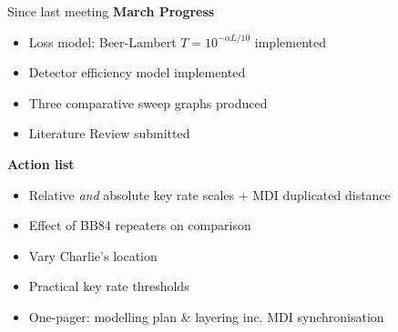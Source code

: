 \documentclass[10pt]{beamer}
\begin{document}
\begin{frame}{Since last meeting}
    \textbf{March Progress}
    \begin{itemize}\small
        \item Loss model: Beer-Lambert $T = 10^{-\alpha L/10}$ implemented
        \item Detector efficiency model implemented
        \item Three comparative sweep graphs produced
        \item Literature Review submitted
    \end{itemize}
    \vspace{0.3cm}
    \textbf{Action list}
    \begin{itemize}\small
        \item Relative \emph{and} absolute key rate scales + MDI duplicated distance\hfill{}
        \item Effect of BB84 repeaters on comparison \hfill{}
        \item Vary Charlie's location \hfill{}
        \item Practical key rate thresholds \hfill{}
        \item One-pager: modelling plan \& layering inc. MDI synchronisation\hfill{}
    \end{itemize}
\end{frame}
 
\end{document}
